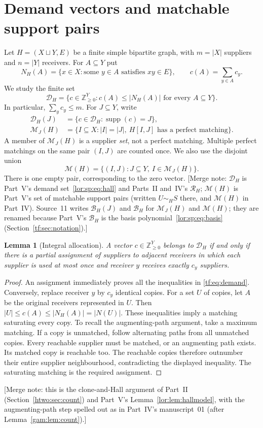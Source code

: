 \documentclass[11pt]{article}
\numberwithin{equation}{section}
\newtheorem{lemma}[theorem]{Lemma}
\theoremstyle{definition}
\newcommand{\N}{\mathbb Z_{\geq0}}
\newcommand{\supp}{\operatorname{supp}}
\newcommand{\PM}{\mathcal M}
\newcommand{\cD}{\mathcal D}
\newcommand{\cB}{\mathcal B}
\begin{document}
\section{Demand vectors and matchable support pairs}
\label{tf:sec:definitions}
Let $H=(X\sqcup Y,E)$ be a finite simple bipartite graph, with
$m=|X|$ suppliers and $n=|Y|$ receivers. For $A\subseteq Y$ put
\[
 N_H(A)=\{x\in X:\text{some }y\in A\text{ satisfies }xy\in E\},
 \qquad c(A)=\sum_{y\in A}c_y.
\]
We study the finite set
\begin{equation}
 \cD_H=\{c\in\N^Y:c(A)\le |N_H(A)|\text{ for every }A\subseteq Y\}.
 \label{tf:eq:demand}
\end{equation}
In particular, $\sum_yc_y\le m$. For $J\subseteq Y$, write
\begin{equation}
 \begin{aligned}
 \cD_H(J)&=\{c\in\cD_H:\supp(c)=J\},\\
 \PM_J(H)&=\{I\subseteq X:|I|=|J|,\ H[I,J]\text{ has a perfect matching}\}.
 \end{aligned}
 \label{tf:eq:fibres}
\end{equation}
A member of $\PM_J(H)$ is a supplier \emph{set}, not a perfect matching.
Multiple perfect matchings on the same pair $(I,J)$ are counted once.
We also use the disjoint union
\[
 \PM(H)=\{(I,J):J\subseteq Y,\ I\in\PM_J(H)\}.
\]
There is one empty pair, corresponding to the zero vector.
[Merge note: $\cD_H$ is Part~V's demand set~\eqref{lor:sp:eq:hall} and
Parts~II and~IV's $\mathcal R_H$; $\PM(H)$ is Part~V's set of matchable
support pairs (written $U\sim_H S$ there, and $\mathcal M(H)$ in
Part~IV). Source~11 writes $\mathcal B_H(J)$ and $\mathcal B_H$ for
$\PM_J(H)$ and $\PM(H)$; they are renamed because Part~V's $\cB_H$ is the
basis polynomial~\eqref{lor:sp:eq:basis} (Section~\ref{tf:sec:notation}).]

\begin{lemma}[Integral allocation]
\label{tf:lem:hall}
A vector $c\in\N^Y$ belongs to $\cD_H$ if and only if there is a partial
assignment of suppliers to adjacent receivers in which each supplier is
used at most once and receiver $y$ receives exactly $c_y$ suppliers.
\end{lemma}
\begin{proof}
An assignment immediately proves all the inequalities in
\eqref{tf:eq:demand}. Conversely, replace receiver $y$ by $c_y$ identical
copies. For a set $U$ of copies, let $A$ be the original receivers
represented in $U$. Then
$|U|\le c(A)\le |N_H(A)|=|N(U)|$.
These inequalities imply a matching saturating every copy. To recall the
augmenting-path argument, take a maximum matching. If a copy is unmatched,
follow alternating paths from all unmatched copies. Every reachable
supplier must be matched, or an augmenting path exists. Its matched copy
is reachable too. The reachable copies therefore outnumber their entire
supplier neighbourhood, contradicting the displayed inequality. The
saturating matching is the required assignment.
\end{proof}
[Merge note: this is the clone-and-Hall argument of Part~II
(Section~\ref{htwo:sec:count}) and Part~V's
Lemma~\ref{lor:lem:hallmodel}, with the augmenting-path step spelled out
as in Part~IV's manuscript~01 (after Lemma~\ref{gam:lem:count}).]
\end{document}
